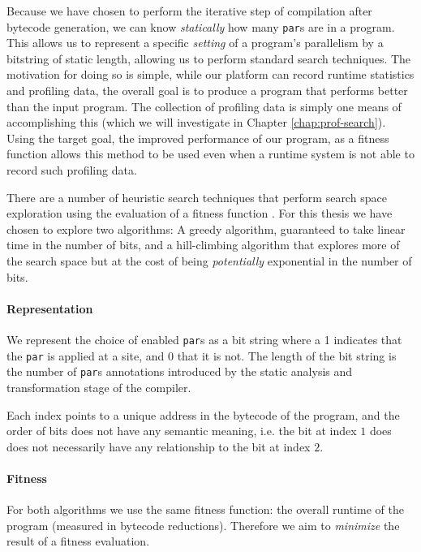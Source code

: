 Because we have chosen to perform the iterative step of compilation after
bytecode generation, we can know \emph{statically} how many \verb|par|s are in
a program. This allows us to represent a specific \emph{setting} of a program's
parallelism by a bitstring of static length, allowing us to perform standard
search techniques. The motivation for doing so is simple, while our platform
can record runtime statistics and profiling data, the overall goal is to
produce a program that performs better than the input program. The collection
of profiling data is simply one means of accomplishing this (which we will
investigate in Chapter \ref{chap:prof-search}). Using the target goal, the
improved performance of our program, as a fitness function allows this method
to be used even when a runtime system is not able to record such profiling
data.

There are a number of heuristic search techniques that perform search space
exploration using the evaluation of a fitness function
\citep{russell1995artificial}. For this thesis we have chosen to explore two
algorithms: A greedy algorithm, guaranteed to take linear time in the number of
bits, and a hill-climbing algorithm that explores more of the search space but
at the cost of being \emph{potentially} exponential in the number of bits.

\paragraph{Representation} 

We represent the choice of enabled \verb-par-s as a bit string where a 1
indicates that the \verb-par- is applied at a site, and 0 that it is not. The
length of the bit string is the number of \verb-par-s annotations introduced by
the static analysis and transformation stage of the compiler.

Each index points to a unique address in the bytecode of the program, and the
order of bits does not have any semantic meaning, i.e. the bit at index $1$
does does not necessarily have any relationship to the bit at index $2$.

\paragraph{Fitness}

For both algorithms we use the same fitness function: the overall runtime of
the program (measured in bytecode reductions). Therefore we aim to
\emph{minimize} the result of a fitness evaluation.

